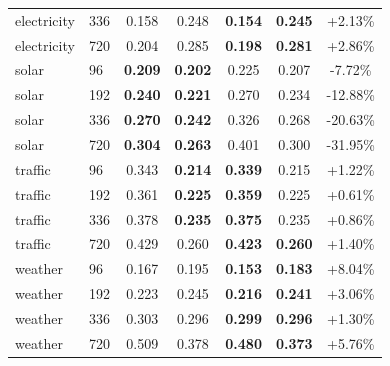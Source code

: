 \begin{table}[t]
\begin{tabular}{ll|cc|cc|c}
electricity & 336 & 0.158  & 0.248  &  \textbf{0.154} &  \textbf{0.245} & +2.13\% \\
electricity & 720 & 0.204  & 0.285  &  \textbf{0.198} &  \textbf{0.281} & +2.86\% \\
solar & 96 & \textbf{0.209}  & \textbf{0.202}  &  0.225 &  0.207 & -7.72\% \\
solar & 192 & \textbf{0.240}  & \textbf{0.221}  &  0.270 &  0.234 & -12.88\% \\
solar & 336 & \textbf{0.270}  & \textbf{0.242}  &  0.326 &  0.268 & -20.63\% \\
solar & 720 & \textbf{0.304}  & \textbf{0.263}  &  0.401 &  0.300 & -31.95\% \\
traffic & 96 & 0.343  & \textbf{0.214}  &  \textbf{0.339} &  0.215 & +1.22\% \\
traffic & 192 & 0.361  & \textbf{0.225}  &  \textbf{0.359} &  0.225 & +0.61\% \\
traffic & 336 & 0.378  & \textbf{0.235}  &  \textbf{0.375} &  0.235 & +0.86\% \\
traffic & 720 & 0.429  & 0.260  &  \textbf{0.423} &  \textbf{0.260} & +1.40\% \\
weather & 96 & 0.167  & 0.195  &  \textbf{0.153} &  \textbf{0.183} & +8.04\% \\
weather & 192 & 0.223  & 0.245  &  \textbf{0.216} &  \textbf{0.241} & +3.06\% \\
weather & 336 & 0.303  & 0.296  &  \textbf{0.299} &  \textbf{0.296} & +1.30\% \\
weather & 720 & 0.509  & 0.378  &  \textbf{0.480} &  \textbf{0.373} & +5.76\% \\
\bottomrule
\end{tabular}
\end{table}